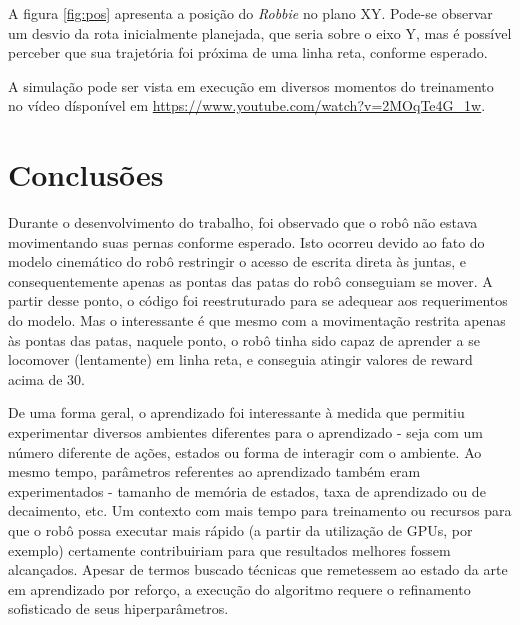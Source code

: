 \documentclass[twoside,conference,a4paper]{IEEEtran}
\begin{document}
A figura \ref{fig:pos} apresenta a posição do \textit{Robbie} no plano XY. Pode-se observar um desvio da rota inicialmente planejada, que seria sobre o eixo Y, mas é possível perceber que sua trajetória foi próxima de uma linha reta, conforme esperado. 

A simulação pode ser vista em execução em diversos momentos do treinamento no vídeo dísponível em \href{https://www.youtube.com/watch?v=2MOqTe4G\_1w}{https://www.youtube.com/watch?v=2MOqTe4G\_1w}.

\section{Conclusões}\label{sec-conc}
Durante o desenvolvimento do trabalho, foi observado que o robô não estava movimentando suas pernas conforme esperado. Isto ocorreu devido ao fato do modelo cinemático do robô restringir o acesso de escrita direta às juntas, e consequentemente apenas as pontas das patas do robô conseguiam se mover. A partir desse ponto, o código foi reestruturado para se adequear aos requerimentos do modelo. Mas o interessante é que mesmo com a movimentação restrita apenas às pontas das patas, naquele ponto, o robô tinha sido capaz de aprender a se locomover (lentamente) em linha reta, e conseguia atingir valores de reward acima de 30.

De uma forma geral, o aprendizado foi interessante à medida que permitiu experimentar diversos ambientes diferentes para o aprendizado - seja com um número diferente de ações, estados ou forma de interagir com o ambiente. Ao mesmo tempo, parâmetros referentes ao aprendizado também eram experimentados - tamanho de memória de estados, taxa de aprendizado ou de decaimento, etc. Um contexto com mais tempo para treinamento ou recursos para que o robô possa executar mais rápido (a partir da utilização de GPUs, por exemplo) certamente contribuiriam para que resultados melhores fossem alcançados. Apesar de termos buscado técnicas que remetessem ao estado da arte em aprendizado por reforço, a execução do algoritmo requere o refinamento sofisticado de seus hiperparâmetros.





\end{document}
